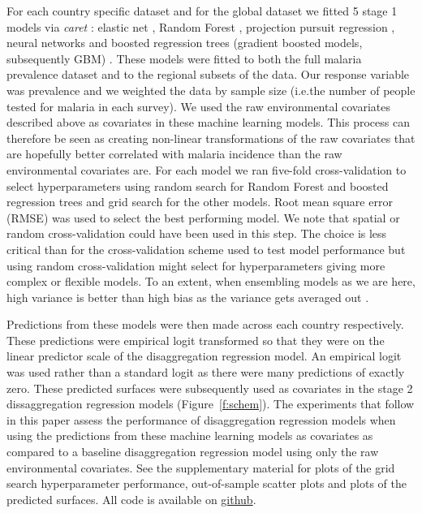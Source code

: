 \documentclass[review]{elsarticle}
\begin{document}
For each country specific dataset and for the global dataset we fitted 5 stage 1 models via \emph{caret} \citep{caret}: elastic net \citep{enet}, Random Forest \citep{wright2015ranger}, projection pursuit regression \citep{friedman1981projection}, neural networks \citep{nnet} and boosted regression trees (gradient boosted models, subsequently GBM) \citep{gbm}.
These models were fitted to both the full malaria prevalence dataset and to the regional subsets of the data.
Our response variable was prevalence and we weighted the data by sample size (i.e.\thinspace the number of people tested for malaria in each survey).
We used the raw environmental covariates described above as covariates in these machine learning models.
This process can therefore be seen as creating non-linear transformations of the raw covariates that are hopefully better correlated with malaria incidence than the raw environmental covariates are.
For each model we ran five-fold cross-validation to select hyperparameters using random search for Random Forest and boosted regression trees and grid search for the other models. 
Root mean square error (RMSE) was used to select the best performing model.
We note that spatial or random cross-validation could have been used in this step.
The choice is less critical than for the cross-validation scheme used to test model performance but using random cross-validation might select for hyperparameters giving more complex or flexible models.
To an extent, when ensembling models as we are here, high variance is better than high bias as the variance gets averaged out \citep{brieman??}.

Predictions from these models were then made across each country respectively.
These predictions were empirical logit transformed so that they were on the linear predictor scale of the disaggregation regression model.
An empirical logit was used rather than a standard logit as there were many predictions of exactly zero.
These predicted surfaces were subsequently used as covariates in the stage 2 dissaggregation regression models (Figure~\ref{f:schem}).
The experiments that follow in this paper assess the performance of disaggregation regression models when using the predictions from these machine learning models as covariates as compared to a baseline disaggregation regression model using only the raw environmental covariates.
See the supplementary material for plots of the grid search hyperparameter performance, out-of-sample scatter plots and plots of the predicted surfaces.
All code is available on \href{https://github.com/timcdlucas/polygon_ml}{github}.
\end{document}
